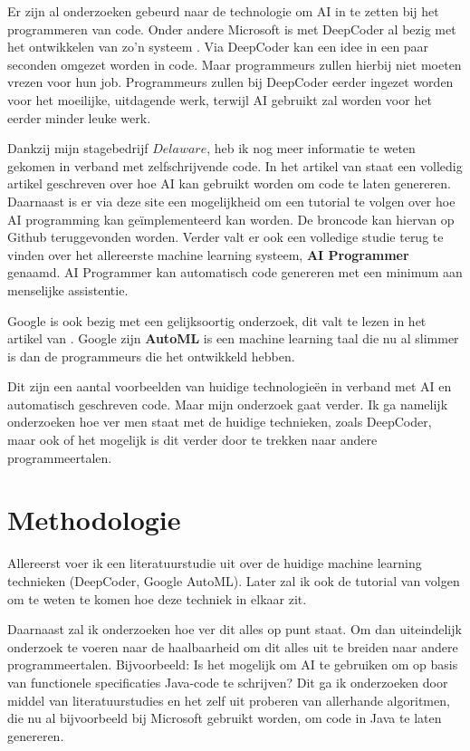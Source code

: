 Er zijn al onderzoeken gebeurd naar de technologie om AI in te zetten bij het programmeren van code. Onder andere Microsoft is met DeepCoder al bezig met het ontwikkelen van zo'n systeem \autocite{DeepCoder}. Via DeepCoder kan een idee in een paar seconden omgezet worden in code. Maar programmeurs zullen hierbij niet moeten vrezen voor hun job. Programmeurs zullen bij DeepCoder eerder ingezet worden voor het moeilijke, uitdagende werk, terwijl AI gebruikt zal worden voor het eerder minder leuke werk.

Dankzij mijn stagebedrijf \(Delaware\), heb ik nog meer informatie te weten gekomen in verband met zelfschrijvende code. In het artikel van  \textcite{primaryObject} staat een volledig artikel geschreven over hoe AI kan gebruikt worden om code te laten genereren. Daarnaast is er via deze site een mogelijkheid om een tutorial te volgen over hoe AI programming kan geïmplementeerd kan worden. De broncode kan hiervan op Github \autocite{github} teruggevonden worden. Verder valt er ook een volledige studie \autocite{aiProgrammer} terug te vinden over het allereerste machine learning systeem, \textbf{AI Programmer} genaamd. AI Programmer kan automatisch code genereren met een minimum aan menselijke assistentie.

Google is ook bezig met een gelijksoortig onderzoek, dit valt te lezen in het artikel van \textcite{green}. Google zijn \textbf{AutoML} is een machine learning taal die nu al slimmer is dan de programmeurs die het ontwikkeld hebben.

Dit zijn een aantal voorbeelden van huidige technologieën in verband met AI en automatisch geschreven code. Maar mijn onderzoek gaat verder. Ik ga namelijk onderzoeken hoe ver men staat met de huidige technieken, zoals DeepCoder, maar ook of het mogelijk is dit verder door te trekken naar andere programmeertalen.

\section{Methodologie}
\label{sec:methodologie}

Allereerst voer ik een literatuurstudie uit over de huidige machine learning technieken (DeepCoder, Google AutoML). Later zal ik ook de tutorial van \textcite{github} volgen om te weten te komen hoe deze techniek in elkaar zit.

Daarnaast zal ik onderzoeken hoe ver dit alles op punt staat. Om dan uiteindelijk onderzoek te voeren naar de haalbaarheid om dit alles uit te breiden naar andere programmeertalen. Bijvoorbeeld: Is het mogelijk om AI te gebruiken om op basis van functionele specificaties Java-code te schrijven? Dit ga ik onderzoeken door middel van literatuurstudies en het zelf uit proberen van allerhande algoritmen, die nu al bijvoorbeeld bij Microsoft gebruikt worden, om code in Java te laten genereren. 

